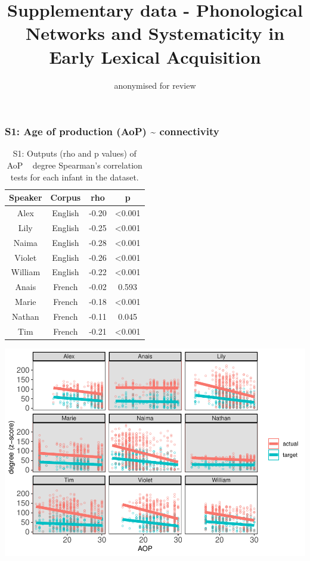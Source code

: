 \documentclass[
]{article}
\title{Supplementary data - Phonological Networks and Systematicity in
Early Lexical Acquisition}
\author{anonymised for review}
\date{}
\begin{document}
\maketitle

\hypertarget{s1-age-of-production-aop-connectivity}{%
\subsubsection{S1: Age of production (AoP) \textasciitilde{}
connectivity}\label{s1-age-of-production-aop-connectivity}}

\begin{longtable}[t]{cccc}
\caption{\label{tab:table-aop-deg-corr}S1: Outputs (rho and p values) of AoP ~ degree Spearman's correlation tests for each infant in the dataset.}\\
\toprule
Speaker & Corpus & rho & p\\
\midrule
Alex & English & -0.20 & <0.001\\
Lily & English & -0.25 & <0.001\\
Naima & English & -0.28 & <0.001\\
Violet & English & -0.26 & <0.001\\
William & English & -0.22 & <0.001\\
\addlinespace
Anais & French & -0.02 & 0.593\\
Marie & French & -0.18 & <0.001\\
Nathan & French & -0.11 & 0.045\\
Tim & French & -0.21 & <0.001\\
\bottomrule
\end{longtable}

\includegraphics{PhonNetworksSupplementaryData-anon_files/figure-latex/Figure-AOP-deg-corr-1.pdf}
\newpage
\end{document}
